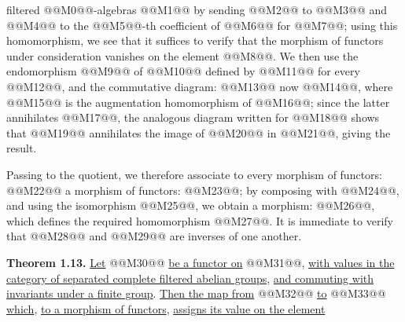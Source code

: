 filtered @@M0@@-algebras @@M1@@ by sending @@M2@@ to @@M3@@ and @@M4@@ to the @@M5@@-th coefficient of @@M6@@ for @@M7@@; using this homomorphism, we see that it suffices to verify that the morphism of functors under consideration vanishes on the element @@M8@@. We then use the endomorphism @@M9@@ of @@M10@@ defined by @@M11@@ for every @@M12@@, and the commutative diagram:
@@M13@@
now @@M14@@, where @@M15@@ is the augmentation homomorphism of @@M16@@; since the latter annihilates @@M17@@, the analogous diagram written for @@M18@@ shows that @@M19@@ annihilates the image of @@M20@@ in @@M21@@, giving the result.

Passing to the quotient, we therefore associate to every morphism of functors: @@M22@@ a morphism of functors: @@M23@@; by composing with @@M24@@, and using the isomorphism @@M25@@, we obtain a morphism: @@M26@@, which defines the required homomorphism @@M27@@. It is immediate to verify that @@M28@@ and @@M29@@ are inverses of one another.

\textbf{Theorem 1.13.} \uline{Let} @@M30@@ \uline{be a functor on} @@M31@@, \uline{with values in the category of separated complete filtered abelian groups}, \uline{and commuting with invariants under a finite group}. \uline{Then the map from} @@M32@@ \uline{to} @@M33@@ \uline{which}, \uline{to a morphism of functors}, \uline{assigns its value on the element}
